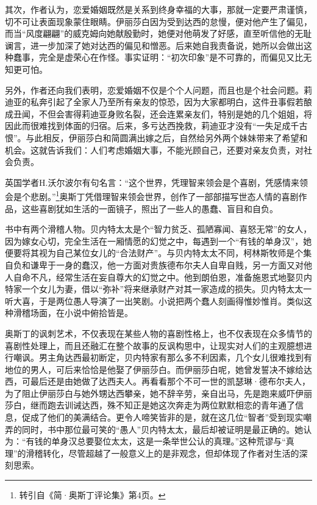 \par 其次，作者认为，恋爱婚姻既然是关系到终身幸福的大事，那就一定要严肃谨慎，切不可让表面现象蒙住眼睛。伊丽莎白因为受到达西的怠慢，便对他产生了偏见，而当“风度翩翩”的威克姆向她献殷勤时，她便对他萌发了好感，直至听信他的无耻谰言，进一步加深了她对达西的偏见和憎恶。后来她自我责备说，她所以会做出这种蠢事，完全是虚荣心在作怪。事实证明：“初次印象”是不可靠的，而偏见又比无知更可怕。
\par 另外，作者还向我们表明，恋爱婚姻不仅是个个人问题，而且也是个社会问题。莉迪亚的私奔引起了全家人乃至所有亲友的惊恐，因为大家都明白，这件丑事假若酿成丑闻，不但会害得莉迪亚身败名裂，还会连累亲友们，特别是她的几个姐姐，将因此而很难找到体面的归宿。后来，多亏达西挽救，莉迪亚才没有“一失足成千古恨”。与此相反，伊丽莎白和简圆满出嫁之后，自然给另外两个妹妹带来了希望和机会。这就告诉我们：人们考虑婚姻大事，不能光顾自己，还要对亲友负责，对社会负责。
\par 英国学者H.沃尔波尔有句名言：“这个世界，凭理智来领会是个喜剧，凭感情来领会是个悲剧。”\footnote{转引自《简·奥斯丁评论集》第4页。}奥斯丁凭借理智来领会世界，创作了一部部描写世态人情的喜剧作品，这些喜剧犹如生活的一面镜子，照出了一些人的愚蠢、盲目和自负。
\par 书中有两个滑稽人物。贝内特太太是个“智力贫乏、孤陋寡闻、喜怒无常”的女人，因为嫁女心切，完全生活在一厢情愿的幻觉之中，每遇到一个“有钱的单身汉”，她便要将其视为自己某位女儿的“合法财产”。与贝内特太太不同，柯林斯牧师是个集自负和谦卑于一身的蠢汉，他一方面对贵族德布尔夫人自卑自贱，另一方面又对他人自命不凡，经常生活在妄自尊大的幻觉之中。他到朗伯恩，准备施恩式地娶贝内特家一个女儿为妻，借以“弥补”将来继承财产对其一家造成的损失。贝内特太太一听大喜，于是两位愚人导演了一出笑剧。小说把两个蠢人刻画得惟妙惟肖。类似这种滑稽场面，在小说中俯拾皆是。
\par 奥斯丁的讽刺艺术，不仅表现在某些人物的喜剧性格上，也不仅表现在众多情节的喜剧性处理上，而且还融汇在整个故事的反讽构思中，让现实对人们的主观臆想进行嘲讽。男主角达西最初断定，贝内特家有那么多不利因素，几个女儿很难找到有地位的男人，可后来恰恰是他娶了伊丽莎白。而伊丽莎白呢，她曾发誓决不嫁给达西，可最后还是由她做了达西夫人。再看看那个不可一世的凯瑟琳·德布尔夫人，为了阻止伊丽莎白与她外甥达西攀亲，她不辞辛劳，亲自出马，先是跑来威吓伊丽莎白，继而跑去训诫达西，殊不知正是她这次奔走为两位默默相恋的青年通了信息，促成了他们的美满结合。更令人啼笑皆非的是，就在这几位“智者”受到现实嘲弄的同时，书中那位最可笑的“愚人”贝内特太太，最后却被证明是最正确的。她认为：“有钱的单身汉总要娶位太太，这是一条举世公认的真理。”这种荒谬与“真理”的滑稽转化，尽管超越了一般意义上的是非观念，但却体现了作者对生活的深刻思索。
